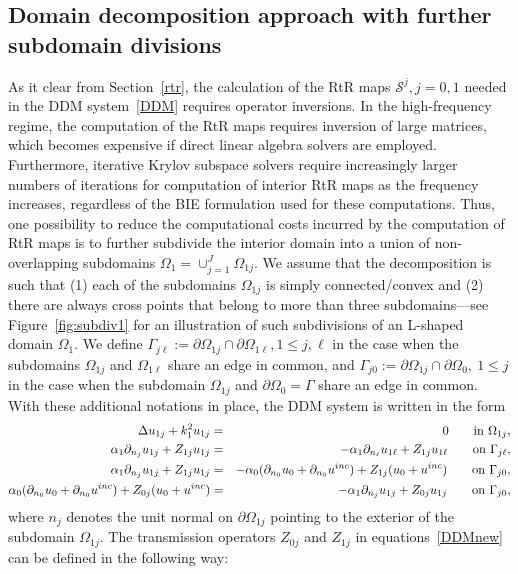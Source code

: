 \documentclass[11pt]{article}
\numberwithin{equation}{section}
\begin{document}
\subsection{Domain decomposition approach with further subdomain divisions~\label{subdivisions}}

As it clear from Section~\ref{rtr}, the calculation of the RtR maps $\mathcal{S}^j,j=0,1$ needed in the DDM system~\eqref{DDM} requires operator inversions. In the high-frequency regime, the computation of the RtR maps requires inversion of large matrices, which becomes expensive if direct linear algebra solvers are employed. Furthermore, iterative Krylov subspace solvers require increasingly larger numbers of iterations for computation of interior RtR maps as the frequency increases, regardless of the BIE formulation used for these computations.  Thus, one possibility to reduce the computational costs incurred by the computation of RtR maps is to further subdivide the interior domain into a union of non-overlapping subdomains $\Omega_1=\cup_{j=1}^J \Omega_{1j}$. We assume that the decomposition is such that (1) each of the subdomains $\Omega_{1j}$ is simply connected/convex and (2) there are always cross points that belong to more than three subdomains---see Figure~\ref{fig:subdiv1} for an illustration of such subdivisions of an L-shaped domain $\Omega_1$. We define $\Gamma_{j\ell}:=\partial\Omega_{1j}\cap\partial\Omega_{1\ell}, 1\leq j,\ell$ in the case when the subdomains $\Omega_{1j}$ and $\Omega_{1\ell}$ share an edge in common, and $\Gamma_{j0}:=\partial\Omega_{1j}\cap\partial\Omega_0,\ 1\leq j$ in the case when the subdomain $\Omega_{1j}$ and $\partial\Omega_0=\Gamma$ share an edge in common. With these additional notations in place, the DDM system is written in the form
\begin{eqnarray}\label{DDMnew}
  \Delta u_{1j} +k_{1}^2 u_{1j} &=&0\qquad {\rm in}\ \Omega_{1j},\\
  \alpha_1\partial_{n_j}u_{1j}+Z_{1j}u_{1j}&=&-\alpha_1\partial_{n_\ell}u_{1\ell}+Z_{1j}u_{1\ell}\qquad{\rm on}\ \Gamma_{j\ell}\nonumber,\\
  \alpha_1\partial_{n_j}u_{1j}+Z_{1j} u_{1j}&=&-\alpha_0(\partial_{n_0}u_{0}+\partial_{n_0}u^{inc})+Z_{1j} (u_{0}+u^{inc})\qquad{\rm on}\ \Gamma_{j0},\nonumber\\
  \alpha_0(\partial_{n_0}u_{0}+\partial_{n_0}u^{inc})+Z_{0j} (u_{0}+u^{inc})&=&-\alpha_1\partial_{n_j}u_{1j}+Z_{0j} u_{1j}\qquad{\rm on}\ \Gamma_{j0}\nonumber,
\end{eqnarray}
where $n_j$ denotes the unit normal on $\partial\Omega_{1j}$ pointing to the exterior of the subdomain $\Omega_{1j}$. The transmission operators $Z_{0j}$ and $Z_{1j}$ in equations~\eqref{DDMnew} can be defined in the following way:
\end{document}
